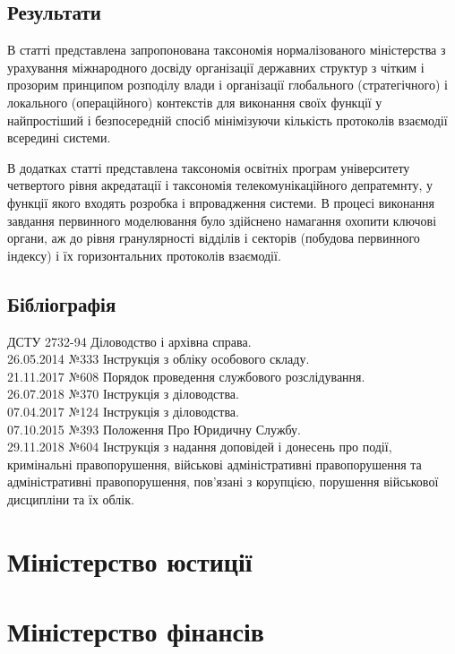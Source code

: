 \subsection{Результати}

В статті представлена запропонована таксономія нормалізованого міністерства з урахування міжнародного досвіду організації державних структур з чітким і прозорим принципом розподілу влади і організації глобального (стратегічного) і локального (операційного) контекстів для виконання своїх функції у найпростіший і безпосередній спосіб мінімізуючи кількість протоколів взаємодії всередині системи.

В додатках статті представлена таксономія освітніх програм університету четвертого рівня акредатації і таксономія телекомунікаційного депратемнту, у функції якого входять розробка і впровадження системи. В процесі виконання завдання первинного моделювання було здійснено намагання охопити ключові органи, аж до рівня гранулярності відділів і секторів (побудова первинного індексу) і їх горизонтальних протоколів взаємодії.

\subsection{Бібліографія}

ДСТУ 2732-94 Діловодство і архівна справа. \\
26.05.2014 №333 Інструкція з обліку особового складу. \\
21.11.2017 №608 Порядок проведення службового розслідування. \\
26.07.2018 №370 Інструкція з діловодства. \\
07.04.2017 №124 Інструкція з діловодства. \\
07.10.2015 №393 Положення Про Юридичну Службу. \\
29.11.2018 №604 Інструкція з надання доповідей і донесень про події,
                кримінальні правопорушення, військові адміністративні
                правопорушення та адміністративні правопорушення,
                пов'язані з корупцією, порушення військової дисципліни та їх облік.

\newpage
\section{Міністерство юстиції}

\section{Міністерство фінансів}

